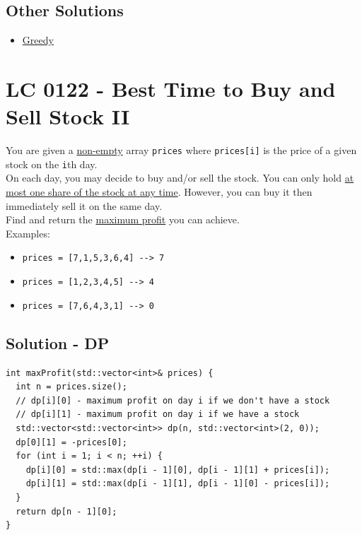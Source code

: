 \subsection*{Other Solutions}
\begin{itemize}
\item \hyperref[solution:lc0121_greedy]{Greedy}
\end{itemize}

\section{LC 0122 - Best Time to Buy and Sell Stock II}
You are given a \ul{non-empty} array {\colorbox{CodeBackground}{\lstinline|prices|}} where {\colorbox{CodeBackground}{\lstinline|prices[i]|}} is the price of a given stock on the {\colorbox{CodeBackground}{\lstinline|i|}}th day.\\

On each day, you may decide to buy and/or sell the stock. You can only hold \ul{at most one share of the stock at any time}. However, you can buy it then immediately sell it on the same day.\\

Find and return the \ul{maximum profit} you can achieve.\\

Examples:
\begin{itemize}
	\item {\colorbox{CodeBackground}{\lstinline|prices = [7,1,5,3,6,4] --> 7|}}
	\item {\colorbox{CodeBackground}{\lstinline|prices = [1,2,3,4,5] --> 4|}}
	\item {\colorbox{CodeBackground}{\lstinline|prices = [7,6,4,3,1] --> 0|}}
\end{itemize}

\subsection*{Solution - DP}\label{solution:lc0122_dp}
\begin{lstlisting}
int maxProfit(std::vector<int>& prices) {
  int n = prices.size();
  // dp[i][0] - maximum profit on day i if we don't have a stock
  // dp[i][1] - maximum profit on day i if we have a stock
  std::vector<std::vector<int>> dp(n, std::vector<int>(2, 0));
  dp[0][1] = -prices[0];
  for (int i = 1; i < n; ++i) {
    dp[i][0] = std::max(dp[i - 1][0], dp[i - 1][1] + prices[i]);
    dp[i][1] = std::max(dp[i - 1][1], dp[i - 1][0] - prices[i]);
  }
  return dp[n - 1][0];
}
\end{lstlisting}

